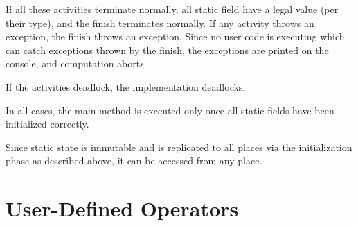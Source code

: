 If all these activities terminate normally, all static field have a
legal value (per their type), and the finish terminates normally. If
any activity throws an exception, the finish throws an
exception. Since no user code is executing which can catch exceptions
thrown by the finish, the exceptions are printed on the console, and
computation aborts.

If the activities deadlock, the implementation deadlocks.

In all cases, the main method is executed only once all static fields
have been initialized correctly.

Since static state is immutable and is replicated to all places via 
the initialization phase as described above, it can be accessed from
any place.



\section{User-Defined Operators}


